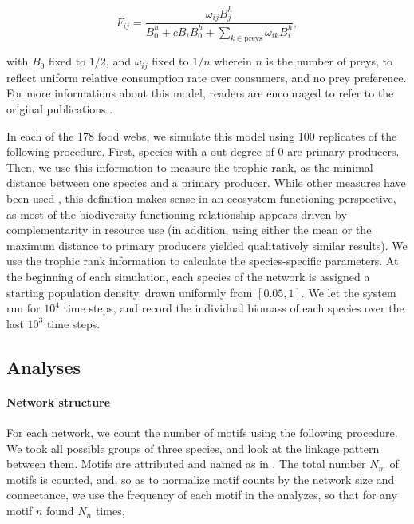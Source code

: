 \documentclass[12pt]{article}
\begin{document}
\begin{equation}
	F_{ij} = \frac{\omega_{ij}B_{j}^h}{B_{0}^{h}+cB_{i}B_{0}^{h}+\sum_{k\in \mathrm{preys}}\omega_{ik}B_{i}^{h}},
\end{equation}

with $B_{0}$ fixed to $1/2$, and $\omega_{ij}$ fixed to $1/n$ wherein $n$ is the number of preys, to reflect uniform relative consumption rate over consumers, and no prey preference. For more informations about this model, readers are encouraged to refer to the original publications \parencite{Brose2006a,Williams2007}.

In each of the 178 food webs, we simulate this model using 100 replicates of the following procedure. First, species with a out degree of 0 are primary producers. Then, we use this information to measure the trophic rank, as the minimal distance between one species and a primary producer. While other measures have been used \parencite{Post2002}, this definition makes sense in an ecosystem functioning perspective, as most of the biodiversity-functioning relationship appears driven by complementarity in resource use (in addition, using either the mean or the maximum distance to primary producers yielded qualitatively similar results). We use the trophic rank information to calculate the species-specific parameters. At the beginning of each simulation, each species of the network is assigned a starting population density, drawn uniformly from $[0.05, 1]$. We let the system run for $10^{4}$ time steps, and record the individual biomass of each species over the last $10^{3}$ time steps.

\subsection{Analyses}

\paragraph{Network structure}

For each network, we count the number of motifs using the following procedure. We took all possible groups of three species, and look at the linkage pattern between them. Motifs are attributed and named as in \textcite{Stouffer2007}. The total number $N_{m}$ of motifs is counted, and, so as to normalize motif counts by the network size and connectance, we use the frequency of each motif in the analyzes, so that for any motif $n$ found $N_{n}$ times,
\end{document}
